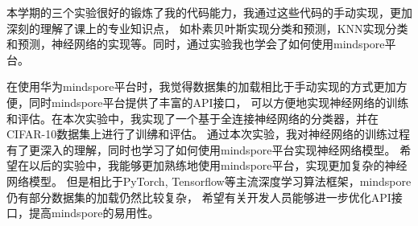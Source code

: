 \documentclass[12pt]{article}
\begin{document}



本学期的三个实验很好的锻炼了我的代码能力，我通过这些代码的手动实现，更加深刻的理解了课上的专业知识点，
如朴素贝叶斯实现分类和预测，KNN实现分类和预测，神经网络的实现等。同时，通过实验我也学会了如何使用mindspore平台。

在使用华为mindspore平台时，我觉得数据集的加载相比于手动实现的方式更加方便，同时mindspore平台提供了丰富的API接口，
可以方便地实现神经网络的训练和评估。在本次实验中，我实现了一个基于全连接神经网络的分类器，并在CIFAR-10数据集上进行了训绋和评估。
通过本次实验，我对神经网络的训练过程有了更深入的理解，同时也学习了如何使用mindspore平台实现神经网络模型。
希望在以后的实验中，我能够更加熟练地使用mindspore平台，实现更加复杂的神经网络模型。
但是相比于PyTorch, Tensorflow等主流深度学习算法框架，mindspore仍有部分数据集的加载仍然比较复杂，
希望有关开发人员能够进一步优化API接口，提高mindspore的易用性。
\end{document}
